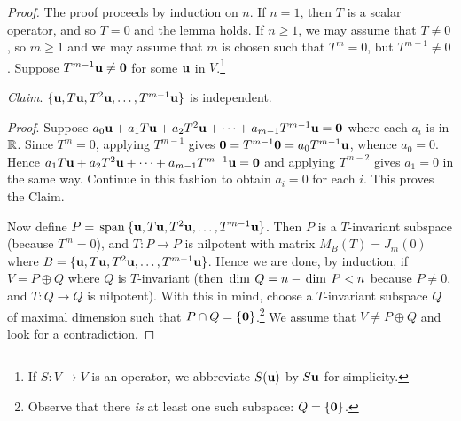 \begin{proof}
The proof proceeds by induction on $n$. If $n = 1$, then $T$ is a scalar operator, and so $T = 0$ and the lemma holds. If $n \geq 1$, we may assume that $T \neq 0$, so $m \geq 1$ and we may assume that $m$ is chosen such that $T^{m} = 0$, but $T^{m-1} \neq 0$. Suppose $T^{m-1}\textbf{u} \neq \textbf{0}$ for some $\textbf{u}$ in $V$.\footnote{If $S : V \to V$ is an operator, we abbreviate $S(\textbf{u})$ by $S\textbf{u}$ for simplicity.}



\noindent \textit{Claim}. $\{\textbf{u}, T\textbf{u}, T^{2}\textbf{u}, \dots, T^{m-1}\textbf{u}\}$ is independent.


\noindent \textit{Proof}. Suppose $a_{0}\textbf{u} + a_{1}T\textbf{u} + a_{2}T^{2}\textbf{u} + \cdots + a_{m-1}T^{m-1}\textbf{u} = \textbf{0}$ where each $a_{i}$ is in $\mathbb{R}$. Since $T^{m} = 0$, applying $T^{m-1}$ gives $\textbf{0} = T^{m-1}\textbf{0} = a_{0} T^{m-1}\textbf{u}$, whence $a_{0} = 0$. Hence $a_{1}T\textbf{u} + a_{2}T^{2}\textbf{u} + \cdots + a_{m-1}T^{m-1}\textbf{u} = \textbf{0}$ and applying $T^{m-2}$ gives $a_{1} = 0$ in the same way. Continue in this fashion to obtain $a_{i} = 0$ for each $i$. This proves the Claim.


Now define $P = \thinspace\operatorname{span\medspace}\{\textbf{u}, T\textbf{u}, T^{2}\textbf{u}, \dots, T^{m-1}\textbf{u}\}$. Then $P$ is a $T$-invariant subspace (because $T^{m} = 0$), and $T : P \to P$ is nilpotent with matrix $M_{B}(T) = J_{m}(0)$ where $B = \{\textbf{u}, T\textbf{u}, T^{2}\textbf{u}, \dots, T^{m-1}\textbf{u}\}$. Hence we are done, by induction, if $V = P \oplus Q$ where $Q$ is $T$-invariant (then $\thinspace\operatorname{dim \medspace}Q = n- \thinspace\operatorname{dim \medspace}P < n$ because $P \neq 0$, and $T : Q \to Q$ is nilpotent). With this in mind, choose a $T$-invariant subspace $Q$ of maximal dimension such that $P \cap Q = \{\textbf{0}\}$.\footnote{Observe that there \textit{is} at least one such subspace: $Q = \{\textbf{0}\}$.} We assume that $V \neq P \oplus Q$ and look for a contradiction.



\end{proof}
